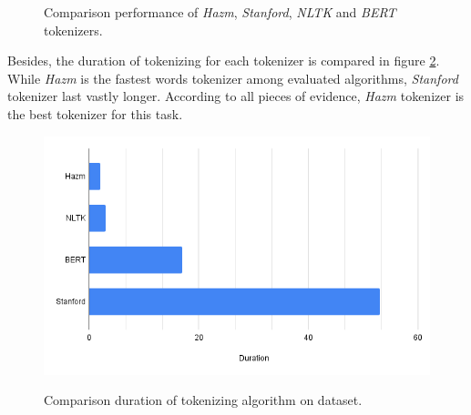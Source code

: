 \begin{figure}%
	\centering
	\qquad
	\qquad
	\caption{Comparison performance of \textit{Hazm}, \textit{Stanford}, \textit{NLTK} and \textit{BERT} tokenizers.}%
	\label{fig:tekenres}%
\end{figure}

Besides, the duration of tokenizing for each tokenizer is compared in figure \ref{fig:tokentime}. While \textit{Hazm} is the fastest words tokenizer among evaluated algorithms, \textit{Stanford} tokenizer last vastly longer. According to all pieces of evidence, \textit{Hazm} tokenizer is the best tokenizer for this task.

\begin{figure}%
	\centering
	{\includegraphics[width=12.5cm]{statistics/tokenizer/duration.png} }
	\caption{Comparison duration of tokenizing algorithm on \cite{stance_persian} dataset.}%
	\label{fig:tokentime}%
\end{figure}

